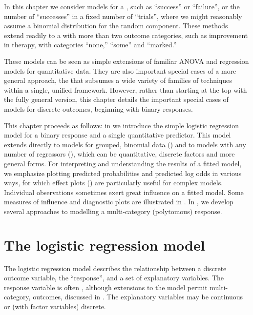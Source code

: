 \documentclass[11pt]{book}\usepackage[]{graphicx}\usepackage[]{color}
\begin{document}
In this chapter we consider models for a ,
such as ``success'' or ``failure'',
or the number of ``successes'' in a fixed number of ``trials'',
where we might reasonably assume a binomial distribution for the
random component.  These methods extend readily to
a  with more than two outcome categories,
such as improvement in therapy, with categories ``none,'' ``some''
and ``marked.''

These models can be seen as simple extensions of familiar ANOVA and
regression models for quantitative data.  They are also
important special cases of a more general approach, the
 that subsumes a wide variety
of families of techniques within a single, unified framework.
However, rather than starting at the top with the fully
general version, this chapter details the important special
cases of models for discrete outcomes, beginning with binary responses.

This chapter proceeds as follows: in 
we introduce the simple logistic regression model for a binary response
and a single quantitative predictor.  This model extends directly
to models for grouped, binomial data ()
and to models with any number of regressors (),
which can be quantitative, discrete factors and more general forms.
For interpreting and understanding the results of a fitted model,
we emphasize plotting predicted probabilities and predicted log odds
in various ways, for which effect plots ()
are particularly useful for complex models.
Individual observations sometimes exert great influence on a fitted model.
Some measures of influence and diagnostic plots are illustrated in
.
In , we develop several approaches to
modelling a multi-category (polytomous) response.

\section{The logistic regression model}\label{sec:logist-model}

The logistic regression model
describes the relationship between a discrete outcome variable,
the ``response'', and a set of explanatory variables.
The response variable is often , although
extensions to the model permit multi-category,
 outcomes, discussed in
.
The explanatory variables may be continuous or (with factor variables)
discrete.
\end{document}
